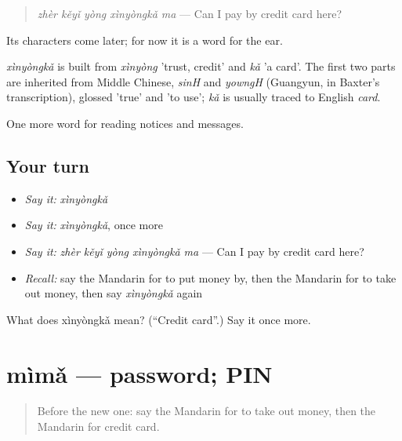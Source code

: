 \begin{quote}
\emph{zhèr kěyǐ yòng xìnyòngkǎ ma} — Can I pay by credit card here?
\end{quote}

Its characters come later; for now it is a word for the ear.

\begin{cousinweb}
\emph{xìnyòngkǎ} is built from \emph{xìnyòng} 'trust, credit' and \emph{kǎ} 'a card'. The first two parts are inherited from Middle Chinese, \emph{sinH} and \emph{yowngH} (Guangyun, in Baxter's transcription), glossed 'true' and 'to use'; \emph{kǎ} is usually traced to English \emph{card}.
\end{cousinweb}

\begin{grammarlens}[title={What you've built}]
One more word for reading notices and messages.
\end{grammarlens}

\subsection*{Your turn}
\begin{itemize}
\raggedright
  \item \emph{Say it:} \emph{xìnyòngkǎ}
  \item \emph{Say it:} \emph{xìnyòngkǎ}, once more
  \item \emph{Say it:} \emph{zhèr kěyǐ yòng xìnyòngkǎ ma} — Can I pay by credit card here?
  \item \emph{Recall:} say the Mandarin for to put money by, then the Mandarin for to take out money, then say \emph{xìnyòngkǎ} again
\end{itemize}

\begin{tcolorbox}[breakable,colback=teal!4,colframe=teal!35!black,title={Before you move on}]
What does xìnyòngkǎ mean? (\textquotedblleft{}Credit card\textquotedblright{}.) Say it once more.
\end{tcolorbox}
\section[mìmǎ]{mìmǎ — password; PIN}

\label{lesson:ZH-C195-mima}



\begin{quote}
Before the new one: say the Mandarin for to take out money, then the Mandarin for credit card.
\end{quote}

